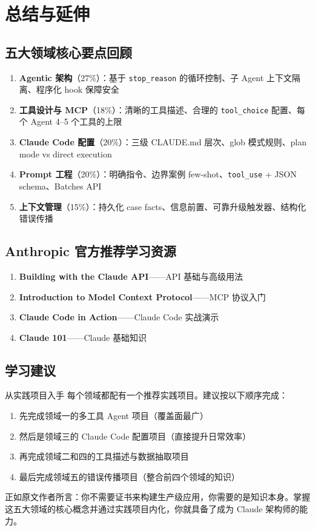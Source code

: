 \section{总结与延伸}

\subsection{五大领域核心要点回顾}

\begin{enumerate}[leftmargin=1.5em]
    \item \textbf{Agentic 架构}（27\%）：基于 \texttt{stop\_reason} 的循环控制、子 Agent 上下文隔离、程序化 hook 保障安全
    \item \textbf{工具设计与 MCP}（18\%）：清晰的工具描述、合理的 \texttt{tool\_choice} 配置、每个 Agent 4--5 个工具的上限
    \item \textbf{Claude Code 配置}（20\%）：三级 CLAUDE.md 层次、glob 模式规则、plan mode vs direct execution
    \item \textbf{Prompt 工程}（20\%）：明确指令、边界案例 few-shot、\texttt{tool\_use} + JSON schema、Batches API
    \item \textbf{上下文管理}（15\%）：持久化 case facts、信息前置、可靠升级触发器、结构化错误传播
\end{enumerate}

\subsection{Anthropic 官方推荐学习资源}

\begin{enumerate}[leftmargin=1.5em]
    \item \textbf{Building with the Claude API}——API 基础与高级用法
    \item \textbf{Introduction to Model Context Protocol}——MCP 协议入门
    \item \textbf{Claude Code in Action}——Claude Code 实战演示
    \item \textbf{Claude 101}——Claude 基础知识
\end{enumerate}

\subsection{学习建议}

\begin{importantbox}{从实践项目入手}
每个领域都配有一个推荐实践项目。建议按以下顺序完成：
\begin{enumerate}[leftmargin=1.5em]
    \item 先完成领域一的多工具 Agent 项目（覆盖面最广）
    \item 然后是领域三的 Claude Code 配置项目（直接提升日常效率）
    \item 再完成领域二和四的工具描述与数据抽取项目
    \item 最后完成领域五的错误传播项目（整合前四个领域的知识）
\end{enumerate}
\end{importantbox}

正如原文作者所言：你不需要证书来构建生产级应用，你需要的是知识本身。掌握这五大领域的核心概念并通过实践项目内化，你就具备了成为 Claude 架构师的能力。



